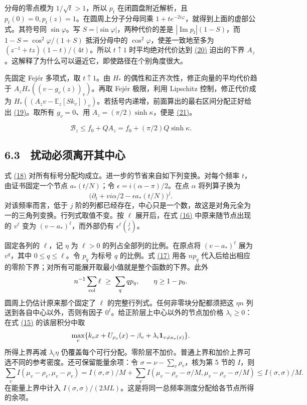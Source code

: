 \documentclass[11pt,a4paper]{article}
\begin{document}
分母的零点模为 \(1/\sqrt t>1\)，所以 \(p_t\) 在闭圆盘附近解析，且 \(p_t(0)=0,p_t(z)=1\)。在圆周上分子分母同乘 \(1+te^{-2i\varphi}\)，就得到上面的虚部公式。其符号同 \(\sin\varphi\)。写 \(S=|\sin\varphi|\)，两种代价的差是 \(|\operatorname{Im}p_t|(1-S)\)，而 \(1-S=\cos^2\varphi/(1+S)\) 抵消分母中的 \(\cos^2\varphi\)，使差一致地至多为 \((z^{-1}+tz)(1-t)/(4t)\)。所以 \(t\uparrow1\) 时平均绝对代价达到 \hyperref[eq:20]{(20)} 迫出的下界 \(A_z\)。这解释了为什么可以逼近它，即使路径在个别角度很大。

先固定 Fejér 多项式，取 \(t\uparrow1\)。由 \(H_*\) 的偶性和正齐次性，修正向量的平均代价趋于 \(A_z H_*((v-g_v(z))_v)\)。再取 Fejér 极限，利用 Lipschitz 控制，修正代价成为 \(H_*((A_zv-\mathbb E_z[Sk_v])_v)\)。若括号内递增，前面算出的最右区间分配正好给出 \hyperref[eq:19]{(19)}。取所有 \(g_v=0\)、用 \(A_z=(\pi/2)\sinh\kappa\)，便是 \hyperref[eq:21]{(21)}。

\[
 \mathcal B_z\le f_0+QA_z=f_0+(\pi/2)Q\sinh\kappa.                       \tag{21}\label{eq:21}
\]

\subsection{6.3　扰动必须离开其中心}
式 \hyperref[eq:18]{(18)} 对所有标号分配均成立。进一步的节省来自如下列变换。对每个频率 \(t\)，由证书固定一个节点 \(a_*(t/N)\)；令 \(\epsilon=i(\alpha-\pi)/2\)。在点 \(\alpha\) 将列算子换为
\[
 \big(\partial_t+vi\alpha/2-\epsilon a_*(t/N)\big)^j .
\]
对该频率而言，低于 \(j\) 阶的列都已经存在，中心只是一个数，故这是对角元全为一的三角列变换。行列式取值不变。按 \(\ell\) 展开后，在式 \hyperref[eq:16]{(16)} 中原来随节点出现的 \(v^\ell\) 变为 \((v-a_*)^\ell\)，而外部仍有 \(\epsilon^\ell\binom j\ell\)。

固定各列的 \(\ell\)，记 \(\eta\) 为 \(\ell>0\) 的列占全部列的比例。在原点将 \((v-a_*)^\ell\) 展为 \(v^q\)，其中 \(0\le q\le\ell\)。令 \(p_q\) 为标号 \(q\) 的比例。式 \hyperref[eq:17]{(17)} 用各 \(np_q\) 代入后给出相应的零阶下界；对所有可能展开取最小值就是整个函数的下界。此外
\[
 n^{-1}\sum_{\rm col}\ell\ \ge\ \sum_q q p_q,\qquad
 \eta\ge 1-p_0 .
\]
圆周上仍估计原来那个固定了 \(\ell\) 的完整行列式。任何非零块分配都须把这 \(\eta n\) 列送到各自中心以外，否则有因子 \(0^\ell\)。给正阶层上中心以外的节点加价格 \(\lambda_i\ge0\)：在式 \hyperref[eq:15]{(15)} 的该层积分中取
\[
  \max_v\{k_vx+U_{\rho_v}(x)-\beta_v+\lambda_i{\bf1}_{v\ne a_*(x)}\}.
\]
所得上界再减 \(\lambda_i\eta\) 仍覆盖每个可行分配。零阶层不加价。普通上界和加价上界可选不同的参考密度。还可保留能量余项：令 \(\sigma=\nu-\sum_v\rho_v\)，核为第 5 节的 \(I\)，则
\[
 \sum_v I(\mu_v-\rho_v,\mu_v-\rho_v)
 =I(\sigma,\sigma)/M+
   \sum_v I(\mu_v-\rho_v-\sigma/M,\mu_v-\rho_v-\sigma/M)
 \le I(\sigma,\sigma)/M .
\]
在能量上界中计入 \(I(\sigma,\sigma)/(2ML)\)。这是将同一总频率测度分配给各节点所得的余项。
\end{document}
